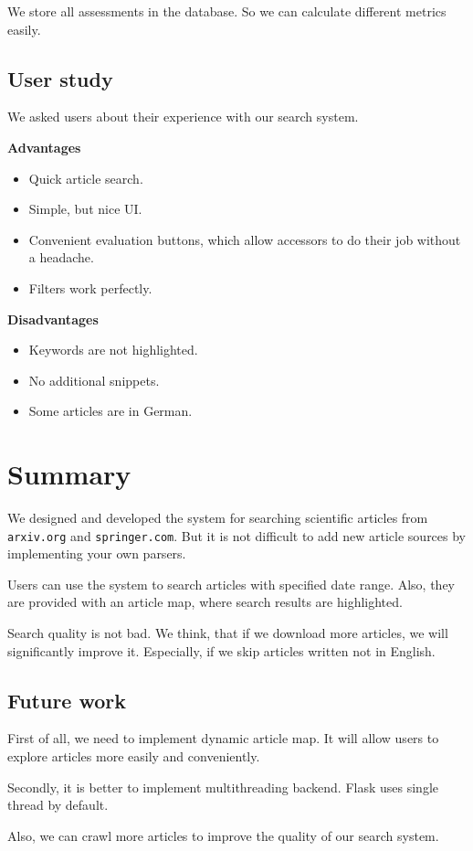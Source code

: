 We store all assessments in the database. So we can calculate different metrics easily.

\subsection{User study}
We asked users about their experience with our search system.

\textbf{Advantages}
\begin{itemize}
	\item Quick article search.
	\item Simple, but nice UI.
	\item Convenient evaluation buttons, which allow accessors to do their job without a headache.
	\item Filters work perfectly.
\end{itemize}

\textbf{Disadvantages}
\begin{itemize}
	\item Keywords are not highlighted.
	\item No additional snippets.
	\item Some articles are in German.
\end{itemize}	
 
\section{Summary}
We designed and developed the system for searching scientific articles from \texttt{arxiv.org} and \texttt{springer.com}. But it is not difficult to add new article sources by implementing your own parsers.

Users can use the system to search articles with specified date range. Also, they are provided with an article map, where search results are highlighted.

Search quality is not bad. We think, that if we download more articles, we will significantly improve it. Especially, if we skip articles written not in English.

\subsection{Future work}
First of all, we need to implement dynamic article map. It will allow users to explore articles more easily and conveniently.

Secondly, it is better to implement multithreading backend. Flask uses single thread by default. 

Also, we can crawl more articles to improve the quality of our search system.

